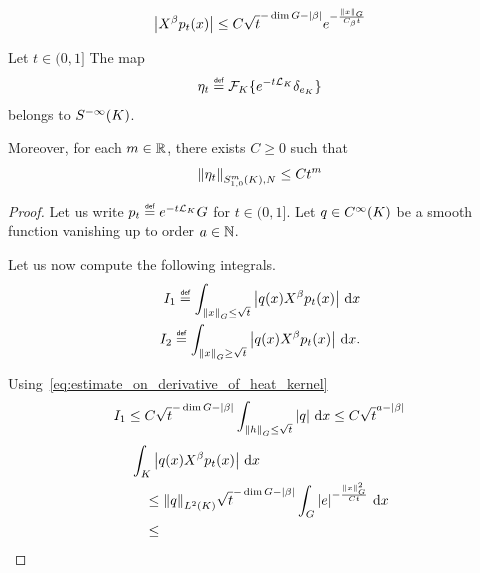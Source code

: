 \begin{align}
    \abs{X^\beta p_t(x)} \leq C \sqrt t^{-\dim \Group - \abs \beta} \e^{-\frac {\norm [\Group] x} {C_\beta t}}
    \label{eq:estimate_on_derivative_of_heat_kernel}
\end{align}

\begin{lemma}
    Let $t \in (0, 1]$
    The map
    \begin{align*}
        \eta_t \defeq \Fourier [\CompactGroup] \{\e^{-t \Laplacian [\CompactGroup]} \DiracDelta{e_\CompactGroup}\}
    \end{align*}
    belongs to $\SmoothingSymbols [\CompactGroup]$.

    Moreover,
    for each $m \in \R$,
    there exists $C \geq 0$ such that
    \begin{align*}
        \SymbolSemiNorm [\CompactGroup] m {1, 0} N {\eta_t}
        \leq C t^m
    \end{align*}
\end{lemma}
\begin{proof}
    Let us write $p_t \defeq \e^{-t \Laplacian [\CompactGroup]} \Group$ for $t \in (0, 1]$.
    Let $q \in \SmoothFunctions \CompactGroup$ be a smooth function vanishing up to order $a \in \N$.

    Let us now compute the following integrals.
    \begin{align*}
        I_1 \defeq \int_{\norm [\Group] x \leq \sqrt t} \abs{q(x) \LeftDifferentialOperator \beta p_t(x)} \dd x\\
        I_2 \defeq \int_{\norm [\Group] x \geq \sqrt t} \abs{q(x) \LeftDifferentialOperator \beta p_t(x)} \dd x.
    \end{align*}

    Using~\eqref{eq:estimate_on_derivative_of_heat_kernel}
    \begin{align*}
        I_1 \leq
        C \sqrt t^{-\dim \Group - \abs \beta} \int_{\norm [\Group] h \leq \sqrt t} \abs q \dd x
        \leq C \sqrt t^{a - \abs \beta}
    \end{align*}
    \begin{align*}
        &\int_\CompactGroup \abs{q(x) \LeftDifferentialOperator \beta p_t(x)} \dd x\\
        &\quad \leq \norm [\Lebesgue 2 \CompactGroup] q
        \sqrt t^{-\dim \Group - \abs \beta} \int_\Group \abs \e^{-\frac {\norm [\Group] x^2} {C t}} \dd x\\
        &\quad \leq
    \end{align*}
\end{proof}

